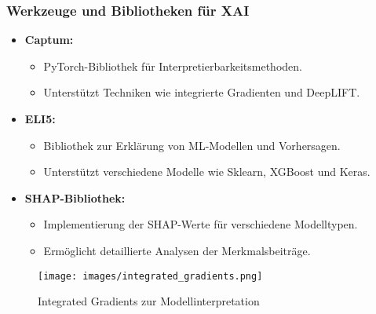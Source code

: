 \documentclass[aspectratio=1610, xcolor=dvipsnames, 9pt]{beamer}
\begin{document}
\begin{frame}
  \frametitle{Werkzeuge und Bibliotheken für XAI}
  \begin{itemize}
      \item \textbf{Captum:}
      \begin{itemize}
          \item PyTorch-Bibliothek für Interpretierbarkeitsmethoden.
          \item Unterstützt Techniken wie integrierte Gradienten und DeepLIFT.
      \end{itemize}
      \item \textbf{ELI5:}
      \begin{itemize}
          \item Bibliothek zur Erklärung von ML-Modellen und Vorhersagen.
          \item Unterstützt verschiedene Modelle wie Sklearn, XGBoost und Keras.
      \end{itemize}
      \item \textbf{SHAP-Bibliothek:}
      \begin{itemize}
          \item Implementierung der SHAP-Werte für verschiedene Modelltypen.
          \item Ermöglicht detaillierte Analysen der Merkmalsbeiträge.
      \end{itemize}
  \end{itemize}
  \begin{figure}
      \centering
        \texttt{[image: images/integrated\_gradients.png]}
        \caption{Integrated Gradients zur Modellinterpretation}
  \end{figure}
\end{frame}
\end{document}
